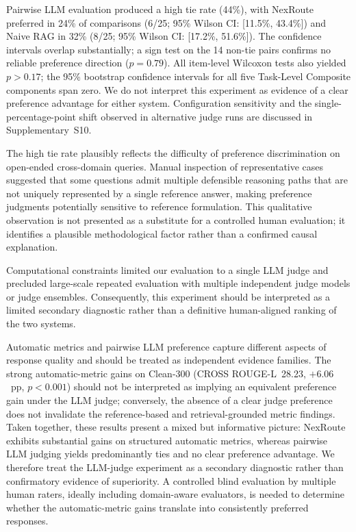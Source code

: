 \documentclass[a4paper,fleql,doubleblind]{cas-sc}
\begin{document}
\noindent
Pairwise LLM evaluation produced a high tie rate (44\%), with NexRoute
preferred in 24\% of comparisons (6/25; 95\% Wilson CI: [11.5\%, 43.4\%])
and Naive RAG in 32\% (8/25; 95\% Wilson CI: [17.2\%, 51.6\%]).
The confidence intervals overlap substantially; a sign test on the 14
non-tie pairs confirms no reliable preference direction ($p{=}0.79$).
All item-level Wilcoxon tests also yielded $p{>}0.17$; the 95\% bootstrap
confidence intervals for all five Task-Level Composite components span zero.
We do not interpret this experiment as evidence of a clear preference advantage
for either system.
Configuration sensitivity and the single-percentage-point shift observed in
alternative judge runs are discussed in Supplementary~S10.

The high tie rate plausibly reflects the difficulty of preference discrimination
on open-ended cross-domain queries.
Manual inspection of representative cases suggested that some questions admit
multiple defensible reasoning paths that are not uniquely represented by a single
reference answer, making preference judgments potentially sensitive to
reference formulation.
This qualitative observation is not presented as a substitute for a
controlled human evaluation; it identifies a plausible methodological factor
rather than a confirmed causal explanation.

Computational constraints limited our evaluation to a single LLM judge and
precluded large-scale repeated evaluation with multiple independent judge models
or judge ensembles.
Consequently, this experiment should be interpreted as a limited secondary
diagnostic rather than a definitive human-aligned ranking of the two systems.

Automatic metrics and pairwise LLM preference capture different aspects of
response quality and should be treated as independent evidence families.
The strong automatic-metric gains on Clean-300 (CROSS ROUGE-L~28.23,
$+6.06$~pp, $p{<}0.001$) should not be interpreted as implying an equivalent
preference gain under the LLM judge; conversely, the absence of a clear judge
preference does not invalidate the reference-based and retrieval-grounded
metric findings.
Taken together, these results present a mixed but informative picture:
NexRoute exhibits substantial gains on structured automatic metrics, whereas
pairwise LLM judging yields predominantly ties and no clear preference advantage.
We therefore treat the LLM-judge experiment as a secondary diagnostic
rather than confirmatory evidence of superiority.
A controlled blind evaluation by multiple human raters, ideally including
domain-aware evaluators, is needed to determine whether the automatic-metric
gains translate into consistently preferred responses.
\end{document}
